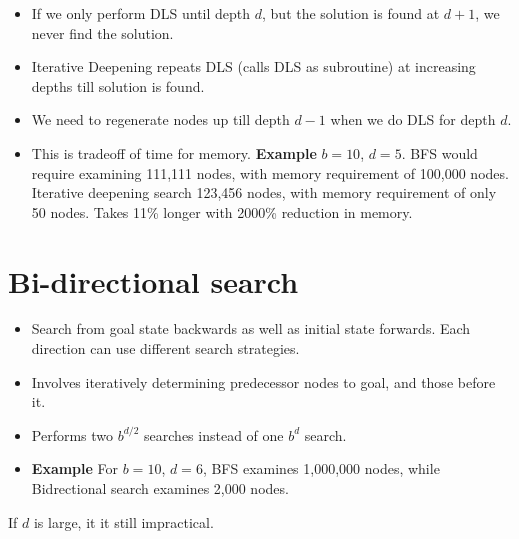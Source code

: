 \documentclass[12pt, a4paper]{article}
\begin{document}
\begin{itemize}
    \item If we only perform DLS until depth $d$, but the solution is found at $d+1$, 
    we never find the solution.
    \item Iterative Deepening repeats DLS (calls DLS as subroutine) at increasing depths till solution is found.
    \item We need to regenerate nodes up till depth $d-1$ when we do DLS for depth $d$.
    \item This is tradeoff of time for memory.\newline
    \textbf{Example} $b=10$, $d=5$. BFS would require examining 111,111 nodes, with memory requirement of 100,000 nodes.
    Iterative deepening search 123,456 nodes, with memory requirement of only 50 nodes. Takes 11\% longer with 2000\% reduction in memory.
\end{itemize}

\newpage

\section{Bi-directional search}
\begin{itemize}
    \item Search from goal state backwards as well as initial state forwards. Each direction can use different search strategies.
    \item Involves iteratively determining predecessor nodes to goal, and those before it.
    \item Performs two $b^{d/2}$ searches instead of one $b^d$ search.
    \item \textbf{Example} For $b=10$, $d=6$, BFS examines 1,000,000 nodes, while Bidrectional search examines 2,000 nodes.
\end{itemize}If $d$ is large, it it still impractical.

\newpage
\end{document}
